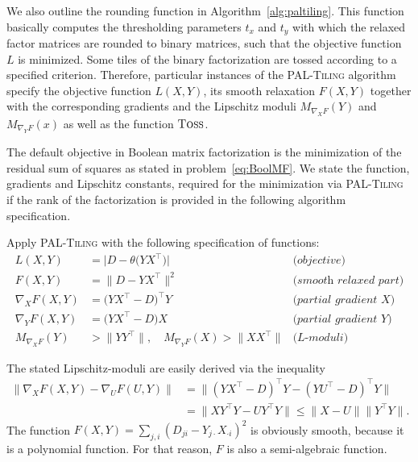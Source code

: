 We also outline the rounding function in Algorithm~\ref{alg:paltiling}. This function basically computes the thresholding parameters $t_x$ and $t_y$ with which the relaxed factor matrices are rounded to binary matrices, such that the objective function $L$ is minimized. Some tiles of the binary factorization are tossed according to a specified criterion. Therefore, particular instances of the \textsc{PAL-Tiling} algorithm specify the objective function $L(X,Y)$, its smooth relaxation $F(X,Y)$ together with the corresponding gradients and the Lipschitz moduli $M_{\nabla_XF}(Y)$ and $M_{\nabla_YF}(x)$ as well as the function $\textsc{Toss}$.

The default objective in Boolean matrix factorization is the minimization of the residual sum of squares as stated in problem~\eqref{eq:BoolMF}. We state the function, gradients and Lipschitz constants, required for the minimization via \textsc{PAL-Tiling} if the rank of the factorization is provided in the following algorithm specification.
\begin{algSpec}\label{algSpec:BMF}
Apply \textsc{PAL-Tiling} with the following specification of functions:
\begin{align*}
    L(X,Y) &= \bigl\lvert D-\theta\bigl(YX^\top\bigr)\bigr\rvert  & \textit{(objective)}\\
    F(X,Y)&=\bigl\lVert D-YX^\top\bigr\rVert^2 &\textit{(smooth relaxed part)}\\
    \nabla_XF(X,Y) &= \bigl(YX^\top-D\bigr)^\top Y &\textit{(partial gradient $X$)}\\
    \nabla_YF(X,Y) &= \bigl(YX^\top-D\bigr) X &\textit{(partial gradient $Y$)}\\
    M_{\nabla_XF}(Y)&>\bigl\lVert YY^\top\bigr\rVert , \quad M_{\nabla_YF}(X)>\bigl\lVert XX^\top\bigr\rVert  &\textit{(L-moduli)} 
\end{align*}
\end{algSpec}
The stated Lipschitz-moduli are easily derived via the inequality
\begin{align*}
    \bigl\lVert \nabla_XF(X,Y) - \nabla_UF(U,Y)\bigr\rVert  &= \bigl\lVert (YX^\top-D)^\top Y - (YU^\top-D)^\top Y\bigr\rVert \\
    &= \bigl\lVert XY^\top Y - UY^\top Y\bigr\rVert  \leq \bigl\lVert X-U\bigr\rVert \bigl\lVert Y^\top Y\bigr\rVert .
\end{align*}
The function $F(X,Y)=\sum_{j,i}(D_{ji}-Y_{ j\cdot}X_{\cdot i})^2$ is obviously smooth, because it is a polynomial function. For that reason, $F$ is also a semi-algebraic function.
